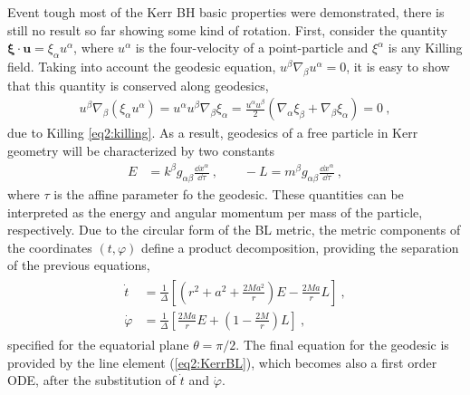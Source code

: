 Event tough most of the Kerr BH basic properties were demonstrated, there is still no result so far showing some kind of rotation.
First, consider the quantity $\bm{\xi}\cdot \bm{u} = \xi_\alpha u^\alpha$, where $u^\alpha$ is the four-velocity of a point-particle and $\xi^\alpha$ is any Killing field. 
Taking into account the geodesic equation, $u^\beta \nabla_\beta u^\alpha = 0$, it is easy to show that this quantity is conserved along geodesics,
\begin{align}
    u^\beta \nabla_\beta ( \xi_\alpha u^\alpha ) = u^\alpha u^\beta \nabla_\beta \xi_\alpha = \frac{u^\alpha u^\beta }{2} \left( \nabla_\alpha \xi_\beta + \nabla_\beta \xi_\alpha \right) = 0 ~,
    \label{eq2:geodesicKilling}
\end{align}
due to Killing \eqref{eq2:killing}.
As a result, geodesics of a free particle in Kerr geometry will be characterized by two constants
\begin{align}
    E &=  k^\beta g_{\alpha\beta} \frac{\dd x^\alpha}{\dd \tau} ~, \qquad -L = m^\beta g_{\alpha\beta} \frac{\dd x^\alpha}{\dd \tau} ~,
    \label{eq2:geodesicConsts}
\end{align}
where $\tau$ is the affine parameter fo the geodesic.
These quantities can be interpreted as the energy and angular momentum per mass of the particle, respectively.
Due to the circular form of the BL metric, the metric components of the coordinates $(t,\varphi)$ define a product decomposition, providing the separation of the previous equations,
\begin{align}
    \label{eq2:geodesicTPhi}
    \begin{split}
        \dot{t} &= \frac{1}{\Delta} \left[ (r^2+a^2 +\frac{2 M a^2}{r})E - \frac{2 M a}{r} L \right] ~,  \\
        \dot{\varphi} &= \frac{1}{\Delta} \left[ \frac{2 M a}{r} E +\left( 1- \frac{2 M}{r} \right) L \right]  ~,
    \end{split}
\end{align}
specified for the equatorial plane $\theta=\pi/2$.
The final equation for the geodesic is provided by the line element (\ref{eq2:KerrBL}), which becomes also a first order ODE, after the substitution of $\dot{t}$ and $\dot{\varphi}$. 

